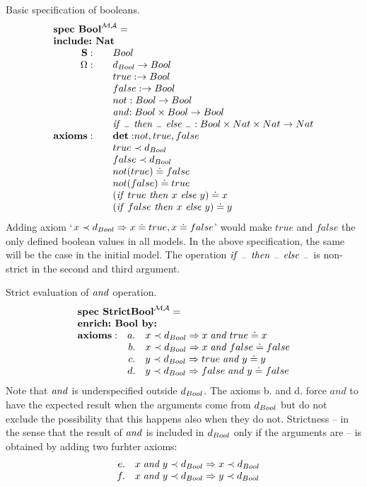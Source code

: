 \documentclass[10pt]{article}
\begin{document}
\begin{example}
Basic specification of booleans.
\[ \spec{
	\tit{\mbox {\bf spec\ Bool}^{\inst{MA}}=} \\	
	\tit{\mbox{\bf include:\ Nat}}\\
	\Sorts:
		&& Bool\\
	\Ops:	&& \ok{Bool} \to Bool\\
		&& true: \to Bool\\
		&& false: \to Bool\\
		&& not: Bool \to Bool\\
		&& \band: Bool \times Bool \to Bool \\
		&& \ite{_{-}}{_{-}}{_{-}}:Bool \times Nat \times Nat \to Nat\\
	{\bf axioms:}
		&&{\bf det:} not,true,false\\
		&& true \prec \ok{Bool}\\
		&& false \prec \ok{Bool}\\
		&& not(true) \eleq false\\
		&& not(false) \eleq true\\
		&& (\ite{true}{x}{y}) \eleq x\\
		&& (\ite{false}{x}{y}) \eleq y\\
}\]
Adding axiom `$x\prec d_{Bool}\Rightarrow x\mathrel{\dot{=} } true, x\mathrel{\dot{=} } false$' would make
	$true$ and $false$ the only defined boolean values in all models. In
	the above specification, the same will be the case in the initial
	model.
The operation $\mathit{if}\ _{-}\ \mathit{then}\ _{-}\ \mathit{else}\ _{-}$ is non-strict in the second and third
argument.
\end{example}

\begin{example}
Strict evaluation of $\mathrel{\mathit{and}}$ operation.
\[ \spec{
	\tit{\mbox {\bf spec\ StrictBool}^{\inst{MA}}=} \\	
	\tit{\mbox{\bf enrich:\  Bool\ by:}}\\
	{\bf axioms:}
		&a.& x \prec \ok{Bool} \To x \band true \eleq x\\
		&b.& x \prec \ok{Bool} \To x \band false \eleq false\\
		&c.& y \prec \ok{Bool} \To true \band y \eleq y\\
		&d.& y \prec \ok{Bool} \To false \band y \eleq false\\
}\]
Note that $\mathrel{\mathit{and}}$ is underspecified outside $d_{Bool}$. The axioms b. and
d. force $and$ to have the expected result when the arguments come from
	$d_{Bool}$ but do not exclude the possibility that this happens also
	when they do not. 
Strictness -- in the sense that the result of $\mathrel{\mathit{and}}$ is included in
$d_{Bool}$ only if the arguments are -- is obtained by adding two
	furhter axioms:
\[\spec{
		&e.& x \band y \prec \ok{Bool} \To x \prec \ok{Bool}\\
		&f.& x \band y \prec \ok{Bool} \To y \prec \ok{Bool}
}
\]
\end{example}
\end{document}

